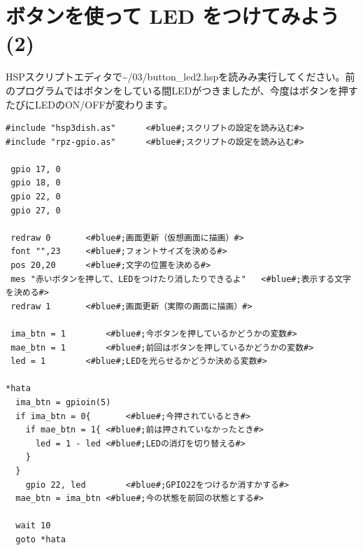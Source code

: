 \documentclass[text03.tex]{subfiles}
\begin{document}
\newpage
\section{ボタンを使って LED をつけてみよう (2)}
HSPスクリプトエディタで\textasciitilde /03/button\_led2.hspを読みみ実行してください。前のプログラムではボタンをしている間LEDがつきましたが、今度はボタンを押すたびにLEDのON/OFFが変わります。\\

\begin{lstlisting}[caption=\textasciitilde/03/button\_led2.hsp,label=button_led2.hsp]
#include "hsp3dish.as"		<#blue#;スクリプトの設定を読み込む#>
#include "rpz-gpio.as"		<#blue#;スクリプトの設定を読み込む#>

 gpio 17, 0
 gpio 18, 0
 gpio 22, 0
 gpio 27, 0
	
 redraw 0		<#blue#;画面更新（仮想画面に描画）#>
 font "",23		<#blue#;フォントサイズを決める#>
 pos 20,20		<#blue#;文字の位置を決める#>
 mes "赤いボタンを押して、LEDをつけたり消したりできるよ"	<#blue#;表示する文字を決める#>
 redraw 1		<#blue#;画面更新（実際の画面に描画）#>

 ima_btn = 1		<#blue#;今ボタンを押しているかどうかの変数#>
 mae_btn = 1		<#blue#;前回はボタンを押しているかどうかの変数#>
 led = 1		<#blue#;LEDを光らせるかどうか決める変数#>

*hata
  ima_btn = gpioin(5)
  if ima_btn = 0{		<#blue#;今押されているとき#>
    if mae_btn = 1{	<#blue#;前は押されていなかったとき#>
      led = 1 - led	<#blue#;LEDの消灯を切り替える#>
    }
  }
    gpio 22, led		<#blue#;GPIO22をつけるか消すかする#>
  mae_btn = ima_btn	<#blue#;今の状態を前回の状態とする#>

  wait 10
  goto *hata
\end{lstlisting}
\end{document}
